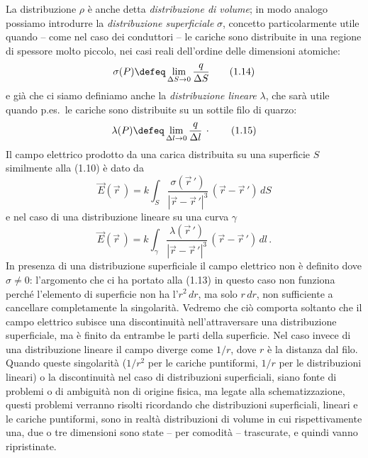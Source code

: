 La distribuzione $\rho$ è anche detta \emph{distribuzione di volume}; in modo analogo possiamo introdurre la \emph{distribuzione superficiale} $\sigma$, concetto particolarmente utile quando -- come nel caso dei conduttori -- le cariche sono distribuite in una regione di spessore molto piccolo, nei casi reali dell'ordine delle dimensioni atomiche:
\begin{equation}
\sigma(P)\defeq\lim_{\Delta S\to0}\frac{q}{\Delta S}
\tag{1.14}
\end{equation}
e già che ci siamo definiamo anche la \emph{distribuzione lineare} $\lambda$, che sarà utile quando p.es.\ le cariche sono distribuite su un sottile filo di quarzo:
\begin{equation}
\lambda(P)\defeq\lim_{\Delta l\to0}\frac{q}{\Delta l}\,\cdot
\tag{1.15}
\end{equation}
Il campo elettrico prodotto da una carica distribuita su una superficie $S$ similmente alla (1.10) è dato da
\begin{equation}
\vec E(\vec r\,)=k\int_S\frac{\sigma(\vec r\,')}{|\vec r-\vec r\,'|^3}\,(\vec r-\vec r\,')\,dS
\tag{1.16}
\end{equation}
e nel caso di una distribuzione lineare su una curva $\gamma$
\begin{equation}
\vec E(\vec r\,)=k\int_\gamma\frac{\lambda(\vec r\,')}{|\vec r-\vec r\,'|^3}\,(\vec r-\vec r\,')\,dl\,.
\tag{1.17}
\end{equation}
In presenza di una distribuzione superficiale il campo elettrico non è definito dove $\sigma\neq0$: l'argomento che ci ha portato alla (1.13) in questo caso non funziona perché l'elemento di superficie non ha l'$r^2\,dr$, ma solo $r\,dr$, non sufficiente a cancellare completamente la singolarità. Vedremo che ciò comporta soltanto che il campo elettrico subisce una discontinuità nell'attraversare una distribuzione superficiale, ma è finito da entrambe le parti della superficie. Nel caso invece di una distribuzione lineare il campo diverge come $1/r$, dove $r$ è la distanza dal filo. Quando queste singolarità ($1/r^2$ per le cariche puntiformi, $1/r$ per le distribuzioni lineari) o la discontinuità nel caso di distribuzioni superficiali, siano fonte di problemi o di ambiguità non di origine fisica, ma legate alla schematizzazione, questi problemi verranno risolti ricordando che distribuzioni superficiali, lineari e le cariche puntiformi, sono in realtà distribuzioni di volume in cui rispettivamente una, due o tre dimensioni sono state -- per comodità -- trascurate, e quindi vanno ripristinate.

